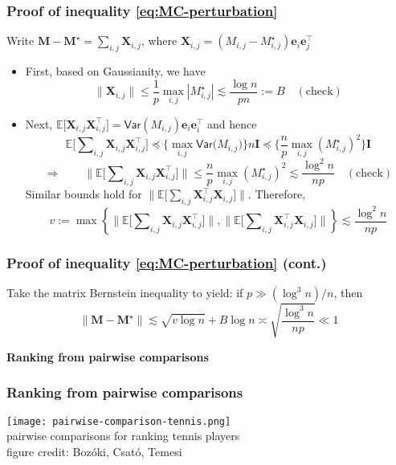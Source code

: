 \documentclass[compress,
mathserif,wide,%
]{beamer}
\begin{document}
\begin{frame}
	\frametitle{Proof of inequality \eqref{eq:MC-perturbation}}

{


Write ${\bm{M}}-\bm{M}^{\star} =\sum_{i,j}\bm{X}_{i,j}$, where $\bm{X}_{i,j}=({M}_{i,j}-M^{\star}_{i,j})\bm{e}_{i}\bm{e}_{j}^{\top}$
\begin{itemize}

\item First, based on Gaussianity, we have
\[
	\|\bm{X}_{i,j}\|\leq\frac{1}{p}\max_{i,j} |M^{\star}_{i,j}| \lesssim\frac{\log n}{pn}:=B \quad (\text{check})
\]


\item Next, $\mathbb{E}\big[\bm{X}_{i,j}\bm{X}_{i,j}^{\top}\big]=\mathsf{Var}({M}_{i,j})\bm{e}_{i}\bm{e}_{i}^{\top}$
and hence
\[
\mathbb{E}\big[\sum\nolimits _{i,j}\bm{X}_{i,j}\bm{X}_{i,j}^{\top}\big]\preceq\Big\{\max_{i,j}\mathsf{Var}\big({M}_{i,j}\big)\Big\} n\bm{I}\preceq\Big\{\frac{n}{p}\max_{i,j}(M^{\star}_{i,j})^{2}\Big\}\bm{I}
\]
\[
\Longrightarrow\qquad\big\|\mathbb{E}\big[\sum\nolimits _{i,j}\bm{X}_{i,j}\bm{X}_{i,j}^{\top}\big]\big\|\leq\frac{n}{p}\max_{i,j}(M^{\star}_{i,j})^{2}\lesssim\frac{\log^{2}n}{np}\quad(\text{check})
\]
Similar bounds hold for $\big\|\mathbb{E}\big[\sum\nolimits _{i,j}\bm{X}_{i,j}^{\top}\bm{X}_{i,j}\big]\big\|$.
Therefore, 
\[
v:=\max\left\{ \big\|\mathbb{E}\big[\sum\nolimits _{i,j}\bm{X}_{i,j}\bm{X}_{i,j}^{\top}\big]\big\|,\big\|\mathbb{E}\big[\sum\nolimits _{i,j}\bm{X}_{i,j}^{\top}\bm{X}_{i,j}\big]\big\|\right\} \lesssim\frac{\log^{2}n}{np}
\]


\end{itemize}



}

\end{frame}

\begin{frame}
	\frametitle{Proof of inequality \eqref{eq:MC-perturbation} (cont.)}
	Take the matrix Bernstein inequality to yield: if $p\gg (\log^{3}n )/n$,
then
\[
 \|\bm{M} - \bm{M}^\star\| \lesssim\sqrt{v\log n}+B\log n \asymp \sqrt{\frac{\log^{3} n }{np}}\ll1
\]
\end{frame}


\begin{frame}[plain]
	\vfill
	\centering
	\Large \bf Ranking from pairwise comparisons
	\vfill
\end{frame}



\begin{frame}
	\frametitle{Ranking from pairwise comparisons}


	\begin{center}
		\texttt{[image: pairwise-comparison-tennis.png]} \\
		 pairwise comparisons for ranking tennis players  \\
		\hfill {\footnotesize figure credit: Boz\'{o}ki, Csat\'{o}, Temesi}
	\end{center}

\end{frame}
\end{document}
